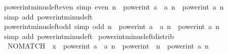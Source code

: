 \begin{isabellebody}
\isanewline
%
\endisadelimproof
\isanewline
{}\isamarkupfalse%
\ power{\isacharunderscore}{\kern0pt}int{\isacharunderscore}{\kern0pt}minus{\isacharunderscore}{\kern0pt}left{\isacharunderscore}{\kern0pt}even\ {\isacharbrackleft}{\kern0pt}simp{\isacharbrackright}{\kern0pt}{\isacharcolon}{\kern0pt}\ {\isachardoublequoteopen}even\ n\ {\isasymLongrightarrow}\ power{\isacharunderscore}{\kern0pt}int\ {\isacharparenleft}{\kern0pt}{\isacharminus}{\kern0pt}a\ {\isacharcolon}{\kern0pt}{\isacharcolon}{\kern0pt}\ {\isacharprime}{\kern0pt}a{\isacharparenright}{\kern0pt}\ n\ {\isacharequal}{\kern0pt}\ power{\isacharunderscore}{\kern0pt}int\ a\ n{\isachardoublequoteclose}\isanewline
%
\isadelimproof
\ \ %
\endisadelimproof
%
\isatagproof
{}\isamarkupfalse%
\ {\isacharparenleft}{\kern0pt}simp\ add{\isacharcolon}{\kern0pt}\ power{\isacharunderscore}{\kern0pt}int{\isacharunderscore}{\kern0pt}minus{\isacharunderscore}{\kern0pt}left{\isacharparenright}{\kern0pt}%
\endisatagproof
{\isafoldproof}%
%
\isadelimproof
\isanewline
%
\endisadelimproof
\isanewline
{}\isamarkupfalse%
\ power{\isacharunderscore}{\kern0pt}int{\isacharunderscore}{\kern0pt}minus{\isacharunderscore}{\kern0pt}left{\isacharunderscore}{\kern0pt}odd\ {\isacharbrackleft}{\kern0pt}simp{\isacharbrackright}{\kern0pt}{\isacharcolon}{\kern0pt}\ {\isachardoublequoteopen}odd\ n\ {\isasymLongrightarrow}\ power{\isacharunderscore}{\kern0pt}int\ {\isacharparenleft}{\kern0pt}{\isacharminus}{\kern0pt}a\ {\isacharcolon}{\kern0pt}{\isacharcolon}{\kern0pt}\ {\isacharprime}{\kern0pt}a{\isacharparenright}{\kern0pt}\ n\ {\isacharequal}{\kern0pt}\ {\isacharminus}{\kern0pt}power{\isacharunderscore}{\kern0pt}int\ a\ n{\isachardoublequoteclose}\isanewline
%
\isadelimproof
\ \ %
\endisadelimproof
%
\isatagproof
{}\isamarkupfalse%
\ {\isacharparenleft}{\kern0pt}simp\ add{\isacharcolon}{\kern0pt}\ power{\isacharunderscore}{\kern0pt}int{\isacharunderscore}{\kern0pt}minus{\isacharunderscore}{\kern0pt}left{\isacharparenright}{\kern0pt}%
\endisatagproof
{\isafoldproof}%
%
\isadelimproof
\isanewline
%
\endisadelimproof
\isanewline
{}\isamarkupfalse%
\ power{\isacharunderscore}{\kern0pt}int{\isacharunderscore}{\kern0pt}minus{\isacharunderscore}{\kern0pt}left{\isacharunderscore}{\kern0pt}distrib{\isacharcolon}{\kern0pt}\isanewline
\ \ {\isachardoublequoteopen}NO{\isacharunderscore}{\kern0pt}MATCH\ {\isacharparenleft}{\kern0pt}{\isacharminus}{\kern0pt}{}{\isacharparenright}{\kern0pt}\ x\ {\isasymLongrightarrow}\ power{\isacharunderscore}{\kern0pt}int\ {\isacharparenleft}{\kern0pt}{\isacharminus}{\kern0pt}a\ {\isacharcolon}{\kern0pt}{\isacharcolon}{\kern0pt}\ {\isacharprime}{\kern0pt}a{\isacharparenright}{\kern0pt}\ n\ {\isacharequal}{\kern0pt}\ power{\isacharunderscore}{\kern0pt}int\ {\isacharparenleft}{\kern0pt}{\isacharminus}{\kern0pt}{}{\isacharparenright}{\kern0pt}\ n\ {\isacharasterisk}{\kern0pt}\ power{\isacharunderscore}{\kern0pt}int\ a\ n{\isachardoublequoteclose}\isanewline

\end{isabellebody}
